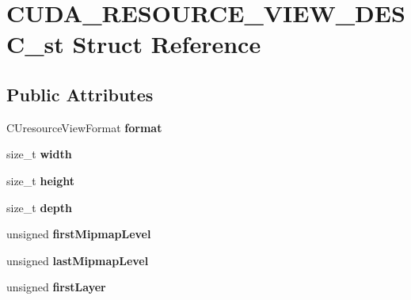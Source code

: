 \hypertarget{structCUDA__RESOURCE__VIEW__DESC__st}{}\section{C\+U\+D\+A\+\_\+\+R\+E\+S\+O\+U\+R\+C\+E\+\_\+\+V\+I\+E\+W\+\_\+\+D\+E\+S\+C\+\_\+st Struct Reference}
\label{structCUDA__RESOURCE__VIEW__DESC__st}
\subsection*{Public Attributes}
\begin{DoxyCompactItemize}
\item 
C\+Uresource\+View\+Format {\bfseries format}\hypertarget{structCUDA__RESOURCE__VIEW__DESC__st_aadf76783b2637205680be0d191038da4}{}\label{structCUDA__RESOURCE__VIEW__DESC__st_aadf76783b2637205680be0d191038da4}

\item 
size\+\_\+t {\bfseries width}\hypertarget{structCUDA__RESOURCE__VIEW__DESC__st_a4b2df38b8f522ce8ed37e03e276cb82e}{}\label{structCUDA__RESOURCE__VIEW__DESC__st_a4b2df38b8f522ce8ed37e03e276cb82e}

\item 
size\+\_\+t {\bfseries height}\hypertarget{structCUDA__RESOURCE__VIEW__DESC__st_ade791ec818a9e32712b9ee8280586bbc}{}\label{structCUDA__RESOURCE__VIEW__DESC__st_ade791ec818a9e32712b9ee8280586bbc}

\item 
size\+\_\+t {\bfseries depth}\hypertarget{structCUDA__RESOURCE__VIEW__DESC__st_ad8304dc608817450ed824fb18e434e8b}{}\label{structCUDA__RESOURCE__VIEW__DESC__st_ad8304dc608817450ed824fb18e434e8b}

\item 
unsigned {\bfseries first\+Mipmap\+Level}\hypertarget{structCUDA__RESOURCE__VIEW__DESC__st_a61745a9ac1f6e049732ba118fbfad2f7}{}\label{structCUDA__RESOURCE__VIEW__DESC__st_a61745a9ac1f6e049732ba118fbfad2f7}

\item 
unsigned {\bfseries last\+Mipmap\+Level}\hypertarget{structCUDA__RESOURCE__VIEW__DESC__st_a3bab3d7a940bd92fe8e482ee28f9f157}{}\label{structCUDA__RESOURCE__VIEW__DESC__st_a3bab3d7a940bd92fe8e482ee28f9f157}

\item 
unsigned {\bfseries first\+Layer}\hypertarget{structCUDA__RESOURCE__VIEW__DESC__st_af07c54890ae8977df6c9a7cdc04a6ca1}{}\label{structCUDA__RESOURCE__VIEW__DESC__st_af07c54890ae8977df6c9a7cdc04a6ca1}


\end{DoxyCompactItemize}
